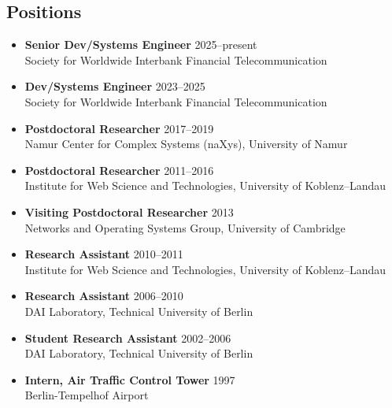 \documentclass[line,mm]{res}
\newcounter{x}
\newcounter{y}
\newcounter{z}
\begin{document}
\begin{resume}
\section{Positions}
\begin{itemize}
\item[] \textbf{Senior Dev/Systems Engineer} \hfill 2025--present \\
  Society for Worldwide Interbank Financial Telecommunication
\item[] \textbf{Dev/Systems Engineer} \hfill 2023--2025 \\
  Society for Worldwide Interbank Financial Telecommunication
\item[] \textbf{Postdoctoral Researcher} \hfill 2017--2019 \\
  Namur Center for Complex Systems (naXys), University of Namur 
\item[] \textbf{Postdoctoral Researcher} \hfill 2011--2016 \\
  Institute for Web Science and Technologies, University of Koblenz--Landau 
\item[] \textbf{Visiting Postdoctoral Researcher} \hfill 2013 \\
  Networks and Operating Systems Group, University of Cambridge
\item[] \textbf{Research Assistant} \hfill 2010--2011 \\
  Institute for Web Science and Technologies, University of Koblenz--Landau 
\item[]   \textbf{Research Assistant} \hfill 2006--2010 \\
  DAI Laboratory, Technical University of Berlin 
\item[] \textbf{Student Research Assistant} \hfill 2002--2006 \\
  DAI Laboratory, Technical University of Berlin
\item[] \textbf{Intern, Air Traffic Control Tower} \hfill 1997 \\
  Berlin-Tempelhof Airport
\end{itemize}


\end{resume}
\end{document}
